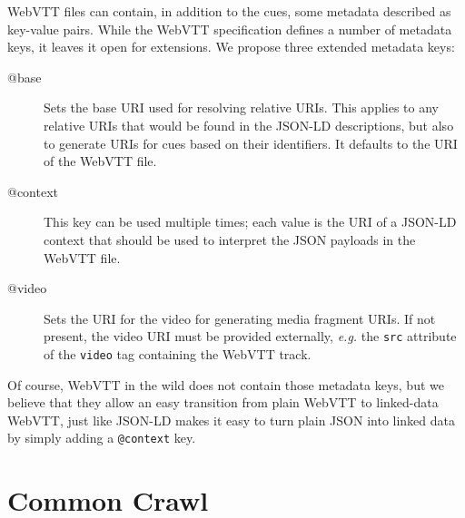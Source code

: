 \documentclass{sig-alternate}
\begin{document}
WebVTT files can contain, in addition to the cues, some metadata described as key-value pairs.
While the WebVTT specification defines a number of metadata keys,
it leaves it open for extensions.
We propose three extended metadata keys:

\begin{description}

\item[@base]
Sets the base URI used for resolving relative URIs.
This applies to any relative URIs that would be found in the JSON-LD descriptions,
but also to generate URIs for cues based on their identifiers.
It defaults to the URI of the WebVTT file.

\item[@context]
This key can be used multiple times; each value is the URI of a JSON-LD context
that should be used to interpret the JSON payloads in the WebVTT file.

\item[@video]
Sets the URI for the video for generating media fragment URIs.
If not present, the video URI must be provided externally,
\textit{e.g.} the \texttt{src} attribute of the \texttt{video} tag
containing the WebVTT track.

\end{description}

Of course, WebVTT in the wild does not contain those metadata keys,
but we believe that they allow an easy transition
from plain WebVTT to linked-data WebVTT,
just like JSON-LD makes it easy to turn plain JSON into linked data
by simply adding a \texttt{@context} key.

\section{Common Crawl}
\end{document}
